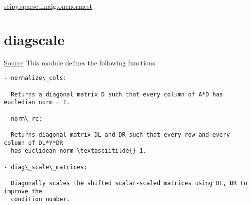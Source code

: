 \documentclass[letterpaper,10pt,english]{sphinxmanual}
\begin{document}


\href{http://docs.scipy.org/doc/scipy-dev/reference/generated/scipy.sparse.linalg.onenormest.html}{scipy.sparse.linalg.onenormest}




\section{diagscale}
\label{index:diagscale}
\href{https://bitbucket.org/akadar/brakesqueal0.1/src/10fdbd0824e88ebbee4f44cefa781c01e586db41/brake/initialize/diagscale.py?at=master}{Source}
\label{index:module-brake.initialize.diagscale}
This module defines the following functions:

\begin{Verbatim}[commandchars=\\\{\}]
- normalize\_cols:

  Returns a diagonal matrix D such that every column of A*D has eucledian norm = 1. 
  
- norm\_rc:

  Returns diagonal matrix DL and DR such that every row and every column of DL*Y*DR
  has euclidean norm \textasciitilde{} 1.

- diag\_scale\_matrices:

  Diagonally scales the shifted scalar-scaled matrices using DL, DR to improve the
  condition number.
\end{Verbatim}
\end{document}
